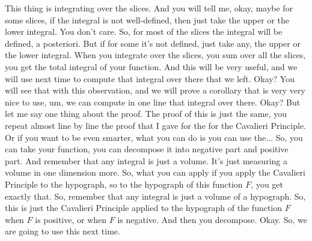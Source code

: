 \begin{spoken-clean}[00:20:16 - 00:21:01]
This thing is integrating over the slices. And you will tell me, okay, maybe for some slices, if the integral is not well-defined, then just take the upper or the lower integral. You don't care. So, for most of the slices the integral will be defined, a posteriori. But if for some it's not defined, just take any, the upper or the lower integral. When you integrate over the slices, you sum over all the slices, you get the total integral of your function. And this will be very useful, and we will use next time to compute that integral over there that we left. Okay? You will see that with this observation, and we will prove a corollary that is very very nice to use, um, we can compute in one line that integral over there. Okay? But let me say one thing about the proof. The proof of this is just the same, you repeat almost line by line the proof that I gave for the for the Cavalieri Principle. Or if you want to be even smarter, what you can do is you can use the... So, you can take your function, you can decompose it into negative part and positive part. And remember that any integral is just a volume. It's just measuring a volume in one dimension more. So, what you can apply if you apply the Cavalieri Principle to the hypograph, so to the hypograph of this function $F$, you get exactly that. So, remember that any integral is just a volume of a hypograph. So, this is just the Cavalieri Principle applied to the hypograph of the function $F$ when $F$ is positive, or when $F$ is negative. And then you decompose. Okay. So, we are going to use this next time.
\end{spoken-clean}
